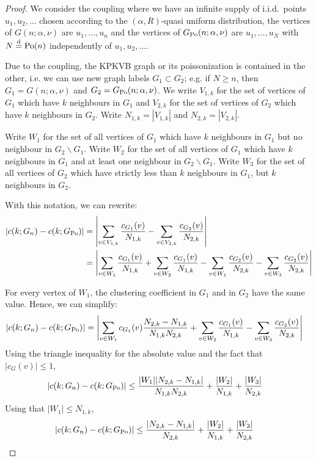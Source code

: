 \begin{proof}
We consider the coupling where we have an infinite supply of i.i.d.~points $u_1, u_2, \dots$ chosen according
to the $(\alpha,R)$-quasi uniform distribution, the vertices of $G(n;\alpha,\nu)$ are $u_1,\dots, u_n$ and 
the vertices of $G_{\text{Po}}(n;\alpha,\nu)$ are $u_1,\dots, u_N$ with $N\stackrel{\text{d}}{=} {\mathrm{Po}}(n)$ independently of
$u_1, u_2, \dots$.

Due to the coupling, the KPKVB graph or its poissonization is contained in the other, i.e. we can use new graph labels $G_1 \subset G_2$; e.g. if $N\geq n$, then $G_1 = G(n;\alpha,\nu)$ and $G_2 = G_{\text{Po}}(n;\alpha,\nu)$. We write $V_{1,k}$ for the set of vertices of $G_1$ which have $k$ neighbours in $G_1$ and $V_{2,k}$ for the set of vertices of $G_2$ which have $k$ neighbours in $G_2$. Write $N_{1,k}=|V_{1,k}|$ and $N_{2,k}=|V_{2,k}|$.

Write $W_1$ for the set of all vertices of $G_1$ which have $k$ neighbours in $G_1$ but no neighbour in $G_2 \backslash G_1$. Write $W_2$ for the set of all vertices of $G_1$ which have $k$ neighbours in $G_1$ and at least one neighbour in $G_2 \backslash G_1$. Write $W_3$ for the set of all vertices of $G_2$ which have strictly less than $k$ neighbours in $G_1$, but $k$ neighbours in $G_2$.

With this notation, we can rewrite:
\begin{align*}
|c(k;G_n)-c(k;G_{\text{Po}})| &= \left|\sum_{v \in V_{1,k}}\frac{c_{G_1}(v)}{N_{1,k}}-\sum_{v \in V_{2,k}}\frac{c_{G_2}(v)}{N_{2,k}}\right| \\
&=\left|\sum_{v \in W_1}\frac{c_{G_1}(v)}{N_{1,k}}+\sum_{v \in W_2}\frac{c_{G_1}(v)}{N_{1,k}}-\sum_{v \in W_1}\frac{c_{G_2}(v)}{N_{2,k}}-\sum_{v \in W_3}\frac{c_{G_2}(v)}{N_{2,k}}\right|
\end{align*}

For every vertex of $W_1$, the clustering coefficient in $G_1$ and in $G_2$ have the same value. Hence, we can simplify:
\begin{align*}
|c(k;G_n)-c(k;G_{\text{Po}})| &= \left|\sum_{v \in W_1}c_{G_1}(v)\frac{N_{2,k}-N_{1,k}}{N_{1,k}N_{2,k}}+\sum_{v \in W_2}\frac{c_{G_1}(v)}{N_{1,k}}-\sum_{v \in W_3}\frac{c_{G_2}(v)}{N_{2,k}}\right|
\end{align*}
Using the triangle inequality for the absolute value and the fact that $|c_G(v)|\leq 1$,
\begin{align*}
|c(k;G_n)-c(k;G_{\text{Po}})| &\leq \frac{|W_1| |N_{2,k}-N_{1,k}|}{N_{1,k}N_{2,k}}+\frac{|W_2|}{N_{1,k}}+\frac{|W_3|}{N_{2,k}}
\end{align*}
Using that $|W_1|\leq N_{1,k}$,
\begin{align*}
|c(k;G_n)-c(k;G_{\text{Po}})| &\leq \frac{|N_{2,k}-N_{1,k}|}{N_{2,k}}+\frac{|W_2|}{N_{1,k}}+\frac{|W_3|}{N_{2,k}}
\end{align*}


\end{proof}

